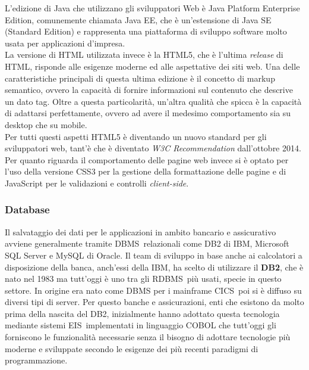 	L'edizione di Java che utilizzano gli sviluppatori Web è Java Platform Enterprise Edition, comunemente chiamata Java EE, che è un'estensione di Java SE (Standard Edition) e rappresenta una piattaforma di sviluppo software molto usata per applicazioni d'impresa.\\
	
	La versione di HTML utilizzata invece è la HTML5, che è l'ultima \textit{release} di HTML, risponde alle esigenze moderne ed alle aspettative dei siti web. Una delle caratteristiche principali di questa ultima edizione è il concetto di markup semantico, ovvero la capacità di fornire informazioni sul contenuto che descrive un dato tag. Oltre a questa particolarità, un'altra qualità che spicca è la capacità di adattarsi perfettamente, ovvero ad avere il medesimo comportamento sia su desktop che su mobile. \\
	
	Per tutti questi aspetti HTML5 è diventando un nuovo standard per gli sviluppatori web, tant'è che è diventato \textit{W3C Recommendation} dall'ottobre 2014.\\

	Per quanto riguarda il comportamento delle pagine web invece si è optato per l'uso della versione CSS3 per la gestione della formattazione delle pagine e di JavaScript per le validazioni e controlli \textit{client-side}.
		
	\subsubsection{Database}
	Il salvataggio dei dati per le applicazioni in ambito bancario e assicurativo avviene generalmente tramite DBMS\glossario\ relazionali come DB2 di IBM, Microsoft SQL Server e MySQL di Oracle. Il team di sviluppo in base anche ai calcolatori a disposizione della banca, anch'essi della IBM, ha scelto di utilizzare il \textbf{DB2}, che è nato nel 1983 ma tutt'oggi è uno tra gli RDBMS\glossario\ più usati, specie in questo settore. In origine era nato come DBMS per i mainframe CICS\glossario\, poi si è diffuso su diversi tipi di server. Per questo banche e assicurazioni, enti che esistono da molto prima della nascita del DB2, inizialmente hanno adottato questa tecnologia mediante sistemi EIS\glossario\ implementati in linguaggio COBOL che tutt'oggi gli forniscono le funzionalità necessarie senza il bisogno di adottare tecnologie più moderne e sviluppate secondo le esigenze dei più recenti paradigmi di programmazione.\\
	
